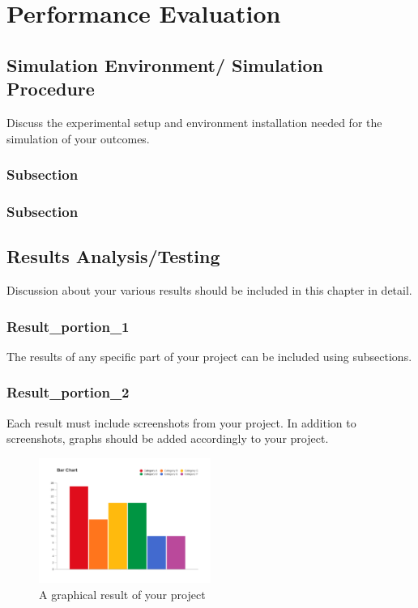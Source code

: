 \documentclass[12pt]{report}
\begin{document}
\newpage
\chapter{Performance Evaluation}

\section{Simulation Environment/ Simulation Procedure}
Discuss the experimental setup and environment installation needed for the simulation of your outcomes.

\subsection{Subsection}
\subsection{Subsection}

\section{Results Analysis/Testing}

Discussion about your various results should be included in this chapter in detail.
\subsection{Result\_portion\_1}
The results of any specific part of your project can be included using subsections.

\subsection{Result\_portion\_2}
Each result must include screenshots from your project. In addition to screenshots, graphs should be added accordingly to your project.

\begin{figure}[thbp]
        \begin{center}
         \includegraphics[width=0.5\textwidth]{Figures/basic-bar-graph.png}
        \end{center}
        \caption{A graphical result of your project}
     \end{figure}
\end{document}
